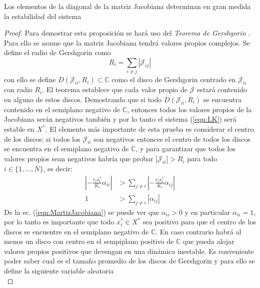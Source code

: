 \begin{proposición}\label{prop:DiagonalI}
	Los elementos de la diagonal de la matriz Jacobiana determinan en gran medida la estabilidad del sistema
	\begin{proof}
		Para demostrar esta proposición se hará uso del \textit{Teorema de Gershgorin} \cite{GershgorinTheorem}. Para ello se asume que la matriz Jacobiana tendrá valores propios complejos. Se define el radio de Gershgorin como
		\begin{equation}\label{proof1:RGershgorin}
			R_i=\sum_{i\neq j}|\mathcal{J}_{ij}|
		\end{equation}
		con ello se define $D(\mathcal{J}_{ii},R_i)\subset\mathbb{C}$ como el disco de Gershgorin centrado en $\mathcal{J}_{ii}$ con radio $R_i$. El teorema establece que cada valor propio de $\mathcal{J}$ estará contenido en alguno de estos discos. Demostrando que si todo $D(\mathcal{J}_{ii},R_i)$ se encuentra contenido en el semiplano negativo de $\mathbb{C}$, entonces todos los valores propios de la Jacobiana serán negativos también y por lo tanto el sistema (\ref{eqn:LK}) será estable en $X^*$. El elemento más importante de esta prueba es considerar el centro de los discos; si todos los $\mathcal{J}_{ii}$ son negativos entonces el centro de todos los discos se encuentra en el semiplano negativo de $\mathbb{C}$, y para garantizar que todos los valores propios sean negativos habría que probar $|\mathcal{J}_{ii}|>R_i$ para todo $i\in\{1,...,N\}$, es decir:
		\begin{equation}\label{proof1:Desigualdad}
			\begin{split}
					 \left |-\frac{r_ix_i^*}{K_i}\alpha_{ii}\right |&>\sum_{j\neq i}\left |-\frac{r_ix_i^*}{K_i}\alpha_{ij}\right |\\
				1&>\sum_{j\neq i}|\alpha_{ij}|
			\end{split}
		\end{equation}
		\newpage
		De la ec. (\ref{eqn:MartizJacobiana}) se puede ver que $\alpha_{ii}>0$ y en particular $\alpha_{ii}=1$, por lo tanto es importante que todo $x_i^*\in X^*$ sea positivo para que el centro de los discos se encuentre en el semiplano negativo de $\mathbb{C}$. En caso contrario habrá al menos un disco con centro en el sempiplano positivo de $\mathbb{C}$ que pueda alojar valores propios positivos que devengan en una dinámica inestable. Es conveniente poder saber cual es el tamaño promedio de los discos de Gershgorin y para ello se define la siguiente variable aleatoria
		\begin{equation}\label{proof1:VarAlW}

\end{equation}
\end{proof}
\end{proposición}
